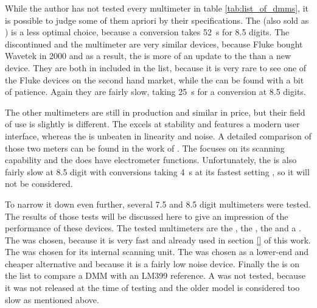 While the author has not tested every multimeter in table \ref{tab:list_of_dmms}, it is possible to judge some of them apriori by their specifications. The  (also sold as ) is a less optimal choice, because a conversion takes \qty{52}{\s} for \num{8.5} digits. The discontinued  and the  multimeter are very similar devices, because Fluke bought Wavetek in 2000 and as a result, the  is more of an update to the  than a new device. They are both in included in the list, because it is very rare to see one of the Fluke devices on the second hand market, while the  can be found with a bit of patience. Again they are fairly slow, taking \qty{25}{\second} for a conversion at \num{8.5} digits.

The other multimeters are still in production and similar in price, but their field of use is slightly is different. The  excels at stability and features a modern user interface, whereas the  is unbeaten in linearity and noise. A detailed comparison of those two meters can be found in the work of \citeauthor*{article_fluke_8588A_noise} \cite{article_fluke_8588A_noise}. The  focuses on its scanning capability and the  does have electrometer functions. Unfortunately, the  is also fairly slow at \num{8.5} digit with conversions taking \qty{4}{\s} at its fastest setting \cite{datasheet_transmille8104}, so it will not be considered.

To narrow it down even further, several \num{7.5} and \num{8.5} digit multimeters were tested. The results of those tests will be discussed here to give an impression of the performance of these devices. The tested multimeters are the , the , the  and a . The  was chosen, because it is very fast and already used in section \ref{} of this work. The  was chosen for its internal scanning unit. The  was chosen as a lower-end and cheaper alternative and because it is a fairly low noise device. Finally the  is on the list to compare a DMM with an LM399 reference. A  was not tested, because it was not released at the time of testing and the older model  is considered too slow as mentioned above.

